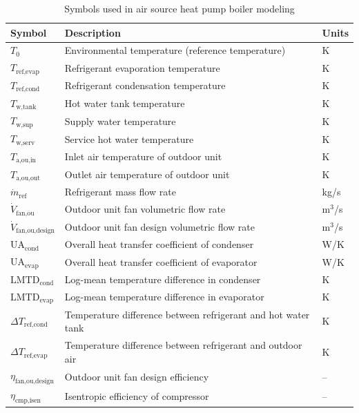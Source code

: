 \documentclass[letterpaper,10pt]{article}
\begin{document}
\begin{table}[t]
\centering
\caption{Symbols used in air source heat pump boiler modeling}
\label{tab:hpb_symbols}
\renewcommand{\arraystretch}{1.2}
\small
\begin{tabularx}{\columnwidth}{l X l}
\toprule
\textbf{Symbol} & \textbf{Description} & \textbf{Units} \\
\midrule
$T_0$ & Environmental temperature (reference temperature) & K \\
$T_{\text{ref,evap}}$ & Refrigerant evaporation temperature & K \\
$T_{\text{ref,cond}}$ & Refrigerant condensation temperature & K \\
$T_{\text{w,tank}}$ & Hot water tank temperature & K \\
$T_{\text{w,sup}}$ & Supply water temperature & K \\
$T_{\text{w,serv}}$ & Service hot water temperature & K \\
$T_{\text{a,ou,in}}$ & Inlet air temperature of outdoor unit & K \\
$T_{\text{a,ou,out}}$ & Outlet air temperature of outdoor unit & K \\
$\dot{m}_{\text{ref}}$ & Refrigerant mass flow rate & kg/s \\
$\dot{V}_{\text{fan,ou}}$ & Outdoor unit fan volumetric flow rate & m$^3$/s \\
$\dot{V}_{\text{fan,ou,design}}$ & Outdoor unit fan design volumetric flow rate & m$^3$/s \\
$\text{UA}_{\text{cond}}$ & Overall heat transfer coefficient of condenser & W/K \\
$\text{UA}_{\text{evap}}$ & Overall heat transfer coefficient of evaporator & W/K \\
$\text{LMTD}_{\text{cond}}$ & Log-mean temperature difference in condenser & K \\
$\text{LMTD}_{\text{evap}}$ & Log-mean temperature difference in evaporator & K \\
$\Delta T_{\text{ref,cond}}$ & Temperature difference between refrigerant and hot water tank & K \\
$\Delta T_{\text{ref,evap}}$ & Temperature difference between refrigerant and outdoor air & K \\
$\eta_{\text{fan,ou,design}}$ & Outdoor unit fan design efficiency & -- \\
$\eta_{\text{cmp,isen}}$ & Isentropic efficiency of compressor & -- \\
\bottomrule
\end{tabularx}
\end{table}
\end{document}
